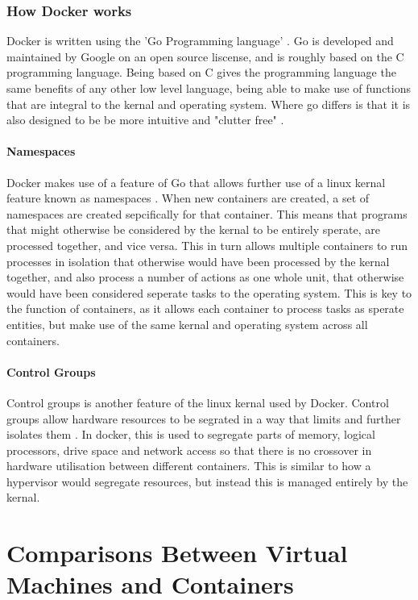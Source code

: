 \subsection{How Docker works}
Docker is written using the 'Go Programming language' \citep[Section: The underlying technology]{DockerOverview}. Go is developed and maintained by Google on an open source liscense, and is roughly based on the C programming language\citep{GoAncestors}. Being based on C gives the programming language the same benefits of any other low level language, being able to make use of functions that are integral to the kernal and operating system. Where go differs is that it is also designed to be be more intuitive and "clutter free" \citep{GoPrinciples}.

\subsubsection{Namespaces}
Docker makes use of a feature of Go that allows further use of a linux kernal feature known as namespaces \citep[Section: Namespaces]{DockerOverview}.
When new containers are created, a set of namespaces are created sepcifically for that container. This means that programs that might otherwise be considered by the kernal to be entirely sperate, are processed together, and vice versa. This in turn allows multiple containers to run processes in isolation that otherwise would have been processed by the kernal together, and also process a number of actions as one whole unit, that otherwise would have been considered seperate tasks to the operating system. This is key to the function of containers, as it allows each container to process tasks as sperate entities, but make use of the same kernal and operating system across all containers.

\subsubsection{Control Groups}
Control groups is another feature of the linux kernal used by Docker. Control groups allow hardware resources to be segrated in a way that limits and further isolates them \citep{corbetControlGroups}. In docker, this is used to segregate parts of memory, logical processors, drive space and network access so that there is no crossover in hardware utilisation between different containers. This is similar to how a hypervisor would segregate resources, but instead this is managed entirely by the kernal.

\chapter{Comparisons Between Virtual Machines and Containers}

